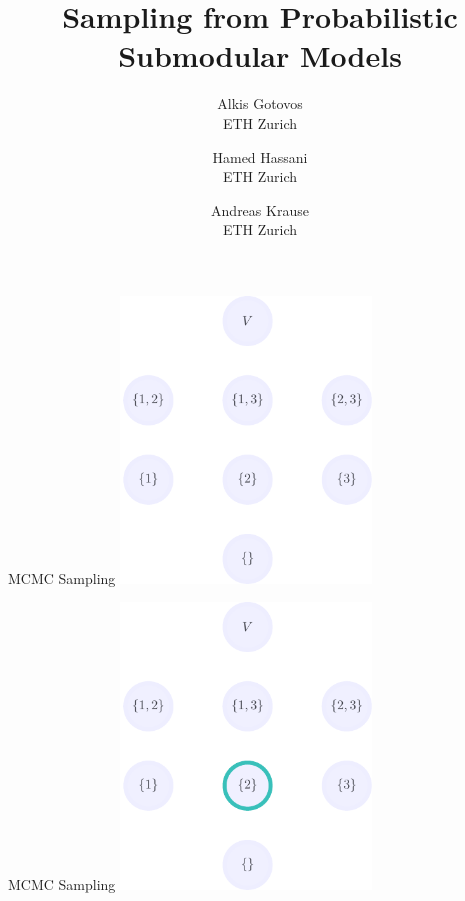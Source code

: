\documentclass[mathserif]{beamer}
\title[Sampling from Probabilistic Submodular Models]
{Sampling from Probabilistic Submodular Models}
\author[Alkis Gotovos]{
\vspace{1in}
\normalsize
\parbox{1in}{Alkis Gotovos\\{\footnotesize ETH Zurich}}\and
\parbox{1in}{Hamed Hassani\\{\footnotesize ETH Zurich}}\and
\parbox{1in}{Andreas Krause\\{\footnotesize ETH Zurich}}
}
\begin{document}


\begin{frame}{MCMC Sampling}
\vspace{0.5em}
\centering
\includegraphics[height=3in]{figures/lattice_nodes_only.pdf}
\end{frame}

\begin{frame}{MCMC Sampling}
\vspace{0.5em}
\centering
\includegraphics[height=3in]{figures/lattice_example_node.pdf}
\end{frame}
\end{document}
